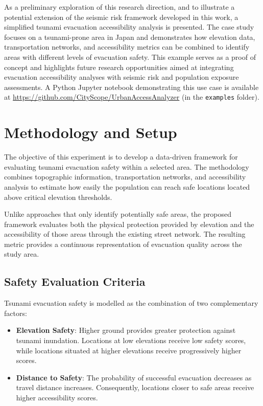 As a preliminary exploration of this research direction, and to illustrate a potential extension of the seismic risk framework developed in this work, a simplified tsunami evacuation accessibility analysis is presented. The case study focuses on a tsunami-prone area in Japan and demonstrates how elevation data, transportation networks, and accessibility metrics can be combined to identify areas with different levels of evacuation safety. This example serves as a proof of concept and highlights future research opportunities aimed at integrating evacuation accessibility analyses with seismic risk and population exposure assessments.
A Python Jupyter notebook demonstrating this use case is available at
\url{https://github.com/CityScope/UrbanAccessAnalyzer} (in the \texttt{examples} folder).

\renewcommand{\sectionnametext}{Methodology and Setup}
\renewcommand{\headingtextR}{\thesection. \sectionnametext}
\section{\sectionnametext}

The objective of this experiment is to develop a data-driven framework for evaluating tsunami evacuation safety within a selected area. The methodology combines topographic information, transportation networks, and accessibility analysis to estimate how easily the population can reach safe locations located above critical elevation thresholds.

Unlike approaches that only identify potentially safe areas, the proposed framework evaluates both the physical protection provided by elevation and the accessibility of those areas through the existing street network. The resulting metric provides a continuous representation of evacuation quality across the study area.

\subsection{Safety Evaluation Criteria}

Tsunami evacuation safety is modelled as the combination of two complementary factors:

\begin{itemize}
    \item \textbf{Elevation Safety}: Higher ground provides greater protection against tsunami inundation. Locations at low elevations receive low safety scores, while locations situated at higher elevations receive progressively higher scores.
    
    
    \item \textbf{Distance to Safety}: The probability of successful evacuation decreases as travel distance increases. Consequently, locations closer to safe areas receive higher accessibility scores. 
\end{itemize}

